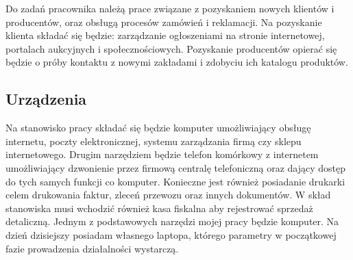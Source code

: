 
	Do zadań pracownika należą prace związane z pozyskaniem nowych klientów i producentów, oraz obsługą procesów zamówień i reklamacji. Na pozyskanie klienta składać się będzie: zarządzanie ogłoszeniami na stronie internetowej, portalach aukcyjnych i społecznościowych. Pozyskanie producentów opierać się będzie o próby kontaktu z nowymi zakładami i zdobyciu ich katalogu produktów.
	
\subsection{Urządzenia} 
	Na stanowisko pracy składać się będzie komputer umożliwiający obsługę internetu, poczty elektronicznej, systemu zarządzania firmą czy sklepu internetowego. Drugim narzędziem będzie telefon komórkowy z internetem umożliwiający dzwonienie przez firmową centralę telefoniczną oraz dający dostęp do tych samych funkcji co komputer. Konieczne jest również posiadanie drukarki celem drukowania faktur, zleceń przewozu oraz innych dokumentów. W skład stanowiska musi wchodzić również kasa fiskalna aby rejestrować sprzedaż detaliczną. Jednym z podstawowych narzędzi mojej pracy będzie komputer. Na dzień dzisiejszy posiadam własnego laptopa, którego parametry w początkowej fazie prowadzenia działalności wystarczą.
 
